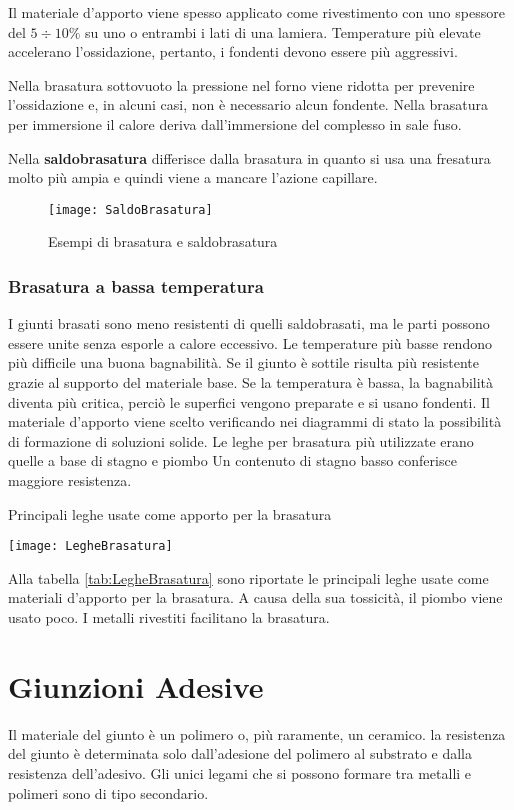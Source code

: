 Il materiale d'apporto viene spesso applicato come rivestimento con uno spessore del $5 \div 10\%$ su uno o entrambi i lati di una lamiera.
Temperature più elevate accelerano l'ossidazione, pertanto, i fondenti devono essere più aggressivi.

Nella brasatura sottovuoto la pressione nel forno viene ridotta per prevenire l'ossidazione e, in alcuni casi, non è necessario alcun fondente.
Nella brasatura per immersione il calore deriva dall'immersione del complesso in sale fuso.

Nella \textbf{saldobrasatura} differisce dalla brasatura in quanto si usa una fresatura molto più ampia e quindi viene a mancare l'azione capillare.

\begin{figure}
\centering
\texttt{[image: SaldoBrasatura]}
\caption{Esempi di brasatura e saldobrasatura}
\label{fig:SaldoBrasatura}
\end{figure}

\subsection{Brasatura a bassa temperatura}
I giunti brasati sono meno resistenti di quelli saldobrasati, ma le parti possono essere unite senza esporle a calore eccessivo.
Le temperature più basse rendono più difficile una buona bagnabilità.
Se il giunto è sottile risulta più resistente grazie al supporto del materiale base.
Se la temperatura è bassa, la bagnabilità diventa più critica, perciò le superfici vengono preparate e si usano fondenti.
Il materiale d'apporto viene scelto verificando nei diagrammi di stato la possibilità di formazione di soluzioni solide.
Le leghe per brasatura più utilizzate erano quelle a base di stagno e piombo
Un contenuto di stagno basso conferisce maggiore resistenza.

\begin{table}
\centering
\caption{Principali leghe usate come apporto per la brasatura}
\label{tab:LegheBrasatura}
\texttt{[image: LegheBrasatura]}
\end{table}

Alla tabella \ref{tab:LegheBrasatura} sono riportate le principali leghe usate come materiali d'apporto per la brasatura.
A causa della sua tossicità, il piombo viene usato poco.
I metalli rivestiti facilitano la brasatura.

\chapter{Giunzioni Adesive}
Il materiale del giunto è un polimero o, più raramente, un ceramico.
la resistenza del giunto è determinata solo dall'adesione del polimero al substrato e dalla resistenza dell'adesivo.
Gli unici legami che si possono formare tra metalli e polimeri sono di tipo secondario.

